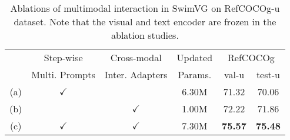 \begin{table}[t]
\centering
\renewcommand{\arraystretch}{1.5}
\caption{Ablations of multimodal interaction in SwimVG on RefCOCOg-u \cite{yu2016modeling} dataset. Note that the visual and text encoder are frozen in the ablation studies.}
\vspace{-2mm}
\label{Table:swip-cia}
\small
\setlength{\tabcolsep}{4pt}
\begin{tabular}{ccc|ccc}
\toprule
& Step-wise & Cross-modal  & Updated  & \multicolumn{2}{c}{RefCOCOg} \\
 & Multi. Prompts & Inter. Adapters  &  Params. & val-u & test-u \\ \midrule

(a)  & $\checkmark$ &    & 6.30M & 71.32  &70.06 \\
(b)  &  & $\checkmark$  &1.00M&72.22 & 71.86\\
  
(c)  &$\checkmark$ & $\checkmark$  &7.30M & \textbf{75.57} & \textbf{75.48} \\ \bottomrule
\end{tabular}

\end{table}

